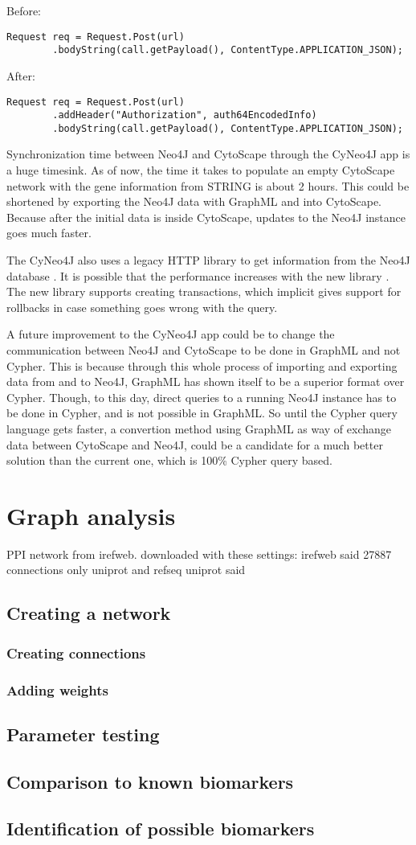 Before:
\begin{verbatim}
Request req = Request.Post(url)
        .bodyString(call.getPayload(), ContentType.APPLICATION_JSON);
\end{verbatim}

After:
\begin{verbatim}
Request req = Request.Post(url)
        .addHeader("Authorization", auth64EncodedInfo)
        .bodyString(call.getPayload(), ContentType.APPLICATION_JSON);
\end{verbatim}

Synchronization time between Neo4J and CytoScape through the CyNeo4J app is a
huge timesink. As of now, the time it takes to populate an empty CytoScape
network with the gene information from STRING is about 2 hours. This could be
shortened by exporting the Neo4J data with GraphML and into CytoScape. Because
after the initial data is inside CytoScape, updates to the Neo4J instance goes
much faster.

The CyNeo4J also uses a legacy HTTP library to get information from the Neo4J
database \cite{legacy-neo4j}. It is possible that the performance increases with
the new library \cite{transactional-neo4j}. The new library supports creating
transactions, which implicit gives support for rollbacks in case something goes
wrong with the query.

A future improvement to the CyNeo4J app could be to change the communication
between Neo4J and CytoScape to be done in GraphML and not Cypher. This is
because through this whole process of importing and exporting data from and to
Neo4J, GraphML has shown itself to be a superior format over Cypher. Though, to
this day, direct queries to a running Neo4J instance has to be done in Cypher,
and is not possible in GraphML. So until the Cypher query language gets faster,
a convertion method using GraphML as way of exchange data between CytoScape and
Neo4J, could be a candidate for a much better solution than the current one,
which is 100\% Cypher query based.

\chapter{Graph analysis}
PPI network from irefweb.
downloaded with these settings: %
irefweb said 27887 connections %
only uniprot and refseq
uniprot said
\section{Creating a network}
\subsection{Creating connections}
\subsection{Adding weights}
\section{Parameter testing}
\section{Comparison to known biomarkers}
\section{Identification of possible biomarkers}

